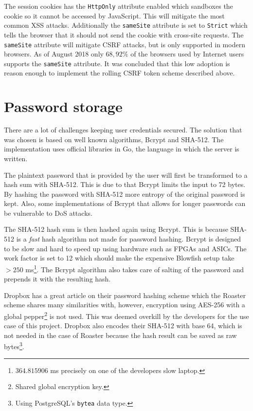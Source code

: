 \documentclass[12pt,a4paper]{report}
\begin{document}
The session cookies has the \texttt{HttpOnly} attribute enabled which sandboxes the cookie so it cannot be accessed by JavaScript. This will mitigate the most common XSS attacks\cite{owasp-httponly}. Additionally the \texttt{sameSite} attribute is set to \texttt{Strict} which tells the browser that it should not send the cookie with cross-site requests\cite{owasp-samesite}. The \texttt{sameSite} attribute will mitigate CSRF attacks, but is only supported in modern browsers. As of August 2018 only $68,92 \%$ of the browsers used by Internet users supports the \texttt{sameSite} attribute\cite{owasp-samesite-support}. It was concluded that this low adoption is reason enough to implement the rolling CSRF token scheme described above.

\section{Password storage}
There are a lot of challenges keeping user credentials secured. The solution that was chosen is based on well known algorithms, Bcrypt and SHA-512. The implementation uses official libraries in Go, the language in which the server is written.

The plaintext password that is provided by the user will first be transformed to a hash sum with SHA-512. This is due to that Bcrypt limits the input to 72 bytes. By hashing the password with SHA-512 more entropy of the original password is kept. Also, some implementations of Bcrypt that allows for longer passwords can be vulnerable to DoS attacks\cite{bcrypt-length}.

The SHA-512 hash sum is then hashed again using Bcrypt. This is because
SHA-512 is a \textit{fast} hash algorithm not made for password hashing. Bcrypt is
designed to be slow and hard to speed up using hardware such as FPGAs and
ASICs. The work factor is set to 12 which should make the expensive Blowfish
setup take $> 250$ ms\footnote{$364.815906$ ms precisely on one of the developers slow laptop.}.
The Bcrypt algorithm also takes care of salting of the password and prepends 
it with the resulting hash.


Dropbox has a great article\cite{dropbox-passwords} on their password hashing scheme
which the Roaster scheme shares many similarities with, however, encryption using AES-256
with a global pepper\footnote{Shared global encryption key.} is not used. This was deemed overkill 
by the developers for the use case of this project. Dropbox also encodes their SHA-512 with base 64,
which is not needed in the case of Roaster because the hash result can be saved as raw
bytes\footnote{Using PostgreSQL's \texttt{bytea} data type.}.
\end{document}
